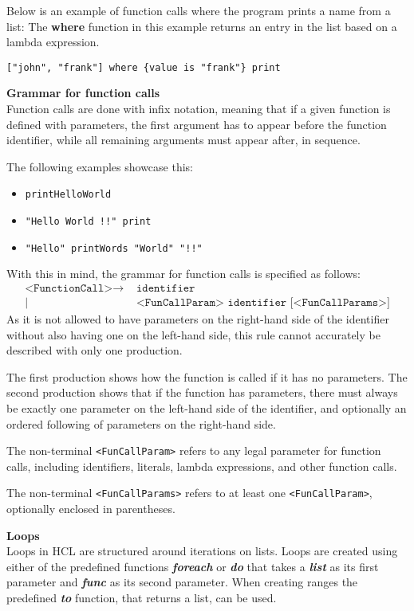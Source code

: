Below is an example of function calls where the program prints a name from a list:
The \textbf{where} function in this example returns an entry in the list based on a lambda expression.
\begin{lstlisting}[language=HCL,label=lis:hclPrintnFromList,firstnumber=1]
["john", "frank"] where {value is "frank"} print
\end{lstlisting}

\textbf{Grammar for function calls}\\
Function calls are done with infix notation, meaning that if a given function is defined with parameters, the first argument has to appear before the function identifier, while all remaining arguments must appear after, in sequence.

The following examples showcase this:
\begin{itemize}
	\item \texttt{printHelloWorld}
	\item \texttt{"Hello World !!" print}
	\item \texttt{"Hello" printWords "World" "!!"}
\end{itemize}
With this in mind, the grammar for function calls is specified as follows:
\begin{align*}
	\texttt{<FunctionCall>}\to & \texttt{ identifier}\\
	| & \texttt{ <FunCallParam> identifier [<FunCallParams>]}
\end{align*}
As it is not allowed to have parameters on the right-hand side of the identifier without also having one on the left-hand side, this rule cannot accurately be described with only one production.

The first production shows how the function is called if it has no parameters.
The second production shows that if the function has parameters, there must always be exactly one parameter on the left-hand side of the identifier, and optionally an ordered following of parameters on the right-hand side.

The non-terminal \texttt{<FunCallParam>} refers to any legal parameter for function calls, including identifiers, literals, lambda expressions, and other function calls.

The non-terminal \texttt{<FunCallParams>} refers to at least one \texttt{<FunCallParam>}, optionally enclosed in parentheses.

\textbf{Loops}\\
Loops in HCL are structured around iterations on lists.
Loops are created using either of the predefined functions \textbf{\textit{foreach}} or \textbf{\textit{do}} that takes a \textbf{\textit{list}} as its first parameter and \textbf{\textit{func}} as its second parameter.
When creating ranges the predefined \textbf{\textit{to}} function, that returns a list, can be used. 

